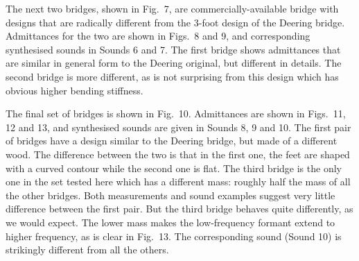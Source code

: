   The next two bridges, shown in Fig.\ 7, are commercially-available bridge 
  with designs that are radically different from the 3-foot design of the 
  Deering bridge. Admittances for the two are shown in Figs.\ 8 and 9, and 
  corresponding synthesised sounds in Sounds 6 and 7. The first bridge shows 
  admittances that are similar in general form to the Deering original, but 
  different in details. The second bridge is more different, as is not 
  surprising from this design which has obvious higher bending stiffness. 






  The final set of bridges is shown in Fig.\ 10. Admittances are shown in 
  Figs.\ 11, 12 and 13, and synthesised sounds are given in Sounds 8, 9 and 10. 
  The first pair of bridges have a design similar to the Deering bridge, but 
  made of a different wood. The difference between the two is that in the first 
  one, the feet are shaped with a curved contour while the second one is flat. 
  The third bridge is the only one in the set tested here which has a different 
  mass: roughly half the mass of all the other bridges. Both measurements and 
  sound examples suggest very little difference between the first pair. But the 
  third bridge behaves quite differently, as we would expect. The lower mass 
  makes the low-frequency formant extend to higher frequency, as is clear in 
  Fig.\ 13. The corresponding sound (Sound 10) is strikingly different from all 
  the others. 


